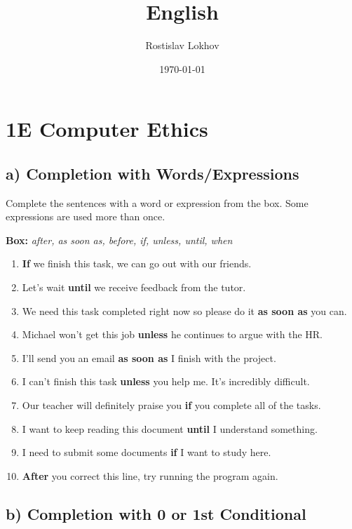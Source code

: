 \documentclass[12pt]{article}
\title{English}
\author{Rostislav Lokhov}
\date{\today}
\begin{document}
\maketitle

\section*{1E Computer Ethics}

\subsection*{a) Completion with Words/Expressions}

Complete the sentences with a word or expression from the box. Some expressions are used more than once.

\textbf{Box:} \textit{after, as soon as, before, if, unless, until, when}

\begin{enumerate}[label=\textbf{01.}]
    \item \textbf{If} we finish this task, we can go out with our friends.
    \item Let’s wait \textbf{until} we receive feedback from the tutor.
    \item We need this task completed right now so please do it \textbf{as soon as} you can.
    \item Michael won’t get this job \textbf{unless} he continues to argue with the HR.
    \item I’ll send you an email \textbf{as soon as} I finish with the project.
    \item I can’t finish this task \textbf{unless} you help me. It’s incredibly difficult.
    \item Our teacher will definitely praise you \textbf{if} you complete all of the tasks.
    \item I want to keep reading this document \textbf{until} I understand something.
    \item I need to submit some documents \textbf{if} I want to study here.
    \item \textbf{After} you correct this line, try running the program again.
\end{enumerate}

\subsection*{b) Completion with 0 or 1st Conditional}
\end{document}
